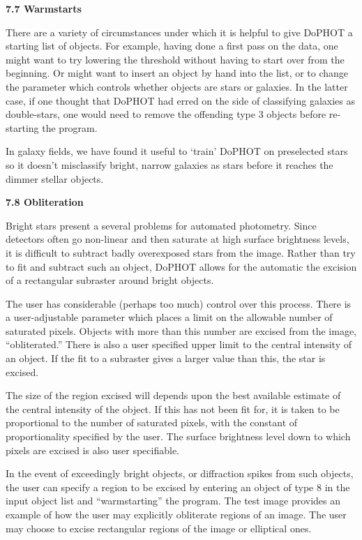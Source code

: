 \centerline{\bf 7.7 Warmstarts}

There are a variety of circumstances under which it is
helpful to give DoPHOT a starting list of objects.  For
example, having done a first pass on the data, one might
want to try lowering the threshold without having to start
over from the beginning.  Or might want to insert
an object by hand into the list, or to change the parameter
which controls whether objects are stars or galaxies.
In the latter case, if one thought that DoPHOT had erred
on the side of classifying galaxies as double-stars, one
would need to remove the offending type 3 objects before
re-starting the program.

In galaxy fields, we have found it useful to `train' DoPHOT
on preselected stars so it doesn't misclassify bright, narrow 
galaxies as stars before it reaches the dimmer stellar objects.

\centerline{\bf 7.8 Obliteration}

Bright stars present a several problems for automated
photometry.  Since detectors often go non-linear and then
saturate at high surface brightness levels, it is difficult
to subtract badly overexposed stars from the image.  Rather
than try to fit and subtract such an object, DoPHOT allows
for the automatic the excision of a rectangular subraster
around bright objects.

The user has considerable (perhaps too much) control over
this process.  There is a user-adjustable parameter which
places a limit on the allowable number of saturated pixels.
Objects with more than this number are excised from the
image, ``obliterated.''  There is also a user specified
upper limit to the central intensity of an object.  If the
fit to a subraster gives a larger value than this, the star
is excised.

The size of the region excised will depends upon the best
available estimate of the central intensity of the object.
If this has not been fit for, it is taken to be proportional
to the number of saturated pixels, with the constant of
proportionality specified by the user.  The surface
brightness level down to which pixels are excised is also
user specifiable.

In the event of exceedingly bright objects, or diffraction
spikes from such objects, the user can specify a region to
be excised by entering an object of type 8 in the input
object list and ``warmstarting'' the program.  
The test image provides an example of how the user
may explicitly obliterate regions of an image.  The user may 
choose to excise rectangular regions of the image or elliptical
ones. 

